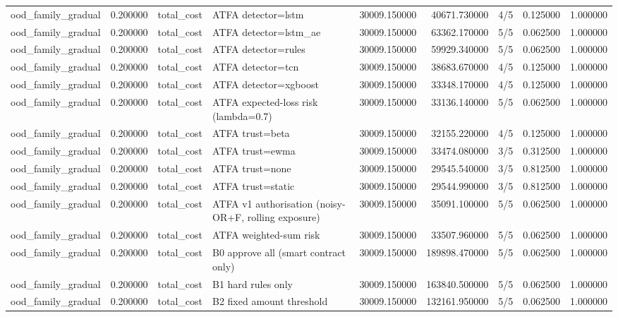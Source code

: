 \begin{tabular}{lrllrrlrr}
ood\_family\_gradual & 0.200000 & total\_cost & ATFA detector=lstm & 30009.150000 & 40671.730000 & 4/5 & 0.125000 & 1.000000 \\
ood\_family\_gradual & 0.200000 & total\_cost & ATFA detector=lstm\_ae & 30009.150000 & 63362.170000 & 5/5 & 0.062500 & 1.000000 \\
ood\_family\_gradual & 0.200000 & total\_cost & ATFA detector=rules & 30009.150000 & 59929.340000 & 5/5 & 0.062500 & 1.000000 \\
ood\_family\_gradual & 0.200000 & total\_cost & ATFA detector=tcn & 30009.150000 & 38683.670000 & 4/5 & 0.125000 & 1.000000 \\
ood\_family\_gradual & 0.200000 & total\_cost & ATFA detector=xgboost & 30009.150000 & 33348.170000 & 4/5 & 0.125000 & 1.000000 \\
ood\_family\_gradual & 0.200000 & total\_cost & ATFA expected-loss risk (lambda=0.7) & 30009.150000 & 33136.140000 & 5/5 & 0.062500 & 1.000000 \\
ood\_family\_gradual & 0.200000 & total\_cost & ATFA trust=beta & 30009.150000 & 32155.220000 & 4/5 & 0.125000 & 1.000000 \\
ood\_family\_gradual & 0.200000 & total\_cost & ATFA trust=ewma & 30009.150000 & 33474.080000 & 3/5 & 0.312500 & 1.000000 \\
ood\_family\_gradual & 0.200000 & total\_cost & ATFA trust=none & 30009.150000 & 29545.540000 & 3/5 & 0.812500 & 1.000000 \\
ood\_family\_gradual & 0.200000 & total\_cost & ATFA trust=static & 30009.150000 & 29544.990000 & 3/5 & 0.812500 & 1.000000 \\
ood\_family\_gradual & 0.200000 & total\_cost & ATFA v1 authorisation (noisy-OR+F, rolling exposure) & 30009.150000 & 35091.100000 & 5/5 & 0.062500 & 1.000000 \\
ood\_family\_gradual & 0.200000 & total\_cost & ATFA weighted-sum risk & 30009.150000 & 33507.960000 & 5/5 & 0.062500 & 1.000000 \\
ood\_family\_gradual & 0.200000 & total\_cost & B0 approve all (smart contract only) & 30009.150000 & 189898.470000 & 5/5 & 0.062500 & 1.000000 \\
ood\_family\_gradual & 0.200000 & total\_cost & B1 hard rules only & 30009.150000 & 163840.500000 & 5/5 & 0.062500 & 1.000000 \\
ood\_family\_gradual & 0.200000 & total\_cost & B2 fixed amount threshold & 30009.150000 & 132161.950000 & 5/5 & 0.062500 & 1.000000 \\

\end{tabular}
